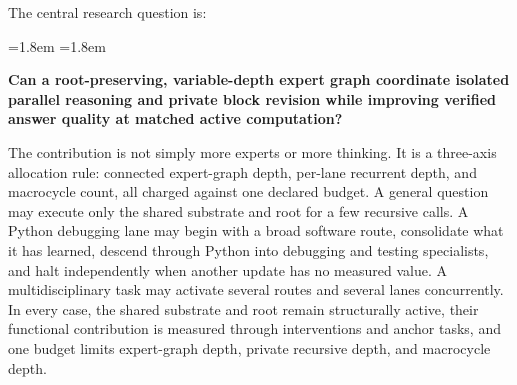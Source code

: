 \documentclass[10pt,a4paper]{article}
\begin{document}
The central research question is:
\begin{list}{}{\leftmargin=1.8em \rightmargin=1.8em}\item\relax
\textbf{\color{navy} Can a root-preserving, variable-depth expert graph
coordinate isolated parallel reasoning and private block revision while
improving verified answer quality at matched active computation?}
\end{list}

The contribution is not simply more experts or more thinking. It is a
three-axis allocation rule: connected expert-graph depth, per-lane recurrent
depth, and macrocycle count, all charged against one declared budget. A general
question may execute only the shared substrate and root for a few recursive
calls. A Python debugging lane may begin with a broad software route,
consolidate what it has learned, descend through Python into debugging and
testing specialists, and halt independently when another update has no measured
value. A multidisciplinary task may activate several routes and several lanes
concurrently. In every case, the shared substrate and root remain structurally
active, their functional contribution is measured through interventions and
anchor tasks, and one budget limits expert-graph depth, private recursive
depth, and macrocycle depth.
\end{document}

